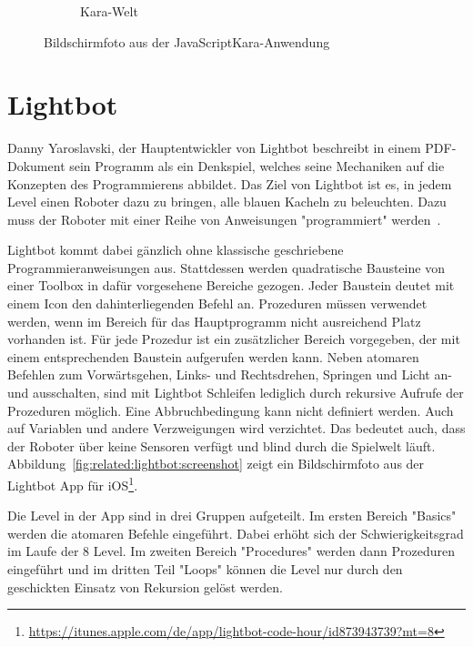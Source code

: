 \begin{figure}
\begin{subfigure}[b]{0.5\textwidth}
        \caption{Kara-Welt}
        \label{fig:related:kara:world}
    \end{subfigure}
    \caption{Bildschirmfoto aus der JavaScriptKara-Anwendung}
    \label{fig:related:kara}
\end{figure}

\section{Lightbot}
\label{sec:related:lightbot}

Danny Yaroslavski, der Hauptentwickler von Lightbot beschreibt in einem PDF-Dokument sein Programm als ein Denkspiel, welches seine Mechaniken auf die Konzepten des Programmierens abbildet. Das Ziel von Lightbot ist es, in jedem Level einen Roboter dazu zu bringen, alle blauen Kacheln zu beleuchten. Dazu muss der Roboter mit einer Reihe von Anweisungen "programmiert" werden~\cite{yaroslavski2014}.

Lightbot kommt dabei gänzlich ohne klassische geschriebene Programmieranweisungen aus. Stattdessen werden quadratische Bausteine von einer Toolbox in dafür vorgesehene Bereiche gezogen. Jeder Baustein deutet mit einem Icon den dahinterliegenden Befehl an. Prozeduren müssen verwendet werden, wenn im Bereich für das Hauptprogramm nicht ausreichend Platz vorhanden ist. Für jede Prozedur ist ein zusätzlicher Bereich vorgegeben, der mit einem entsprechenden Baustein aufgerufen werden kann. Neben atomaren Befehlen zum Vorwärtsgehen, Links- und Rechtsdrehen, Springen und Licht an- und ausschalten, sind mit Lightbot Schleifen lediglich durch rekursive Aufrufe der Prozeduren möglich. Eine Abbruchbedingung kann nicht definiert werden. Auch auf Variablen und andere Verzweigungen wird verzichtet. Das bedeutet auch, dass der Roboter über keine Sensoren verfügt und blind durch die Spielwelt läuft. Abbildung~\ref{fig:related:lightbot:screenshot} zeigt ein Bildschirmfoto aus der Lightbot App für iOS\footnote{\url{https://itunes.apple.com/de/app/lightbot-code-hour/id873943739?mt=8}}.

Die Level in der App sind in drei Gruppen aufgeteilt. Im ersten Bereich "Basics" werden die atomaren Befehle eingeführt. Dabei erhöht sich der Schwierigkeitsgrad im Laufe der 8 Level. Im zweiten Bereich "Procedures" werden dann Prozeduren eingeführt und im dritten Teil "Loops" können die Level nur durch den geschickten Einsatz von Rekursion gelöst werden.

